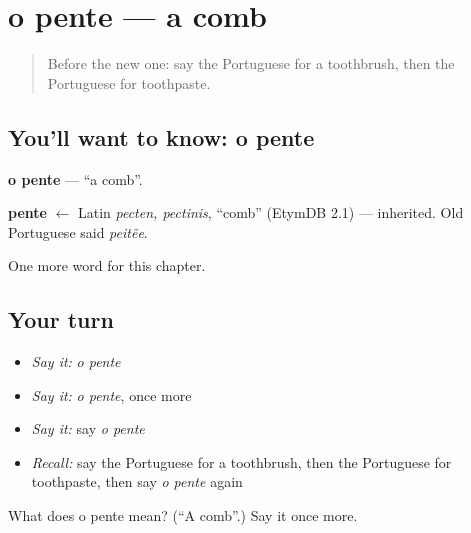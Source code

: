 \section[o pente]{o pente — a comb}

\label{lesson:PT-C95-pente}



\begin{quote}
Before the new one: say the Portuguese for a toothbrush, then the Portuguese for toothpaste.
\end{quote}

\subsection*{You'll want to know: o pente}
\textbf{o pente} — \textquotedblleft{}a comb\textquotedblright{}.

\begin{cousinweb}
\textbf{pente} $\leftarrow$ Latin \emph{pecten, pectinis}, \textquotedblleft{}comb\textquotedblright{} (EtymDB 2.1) — inherited. Old Portuguese said \emph{peitẽe}.
\end{cousinweb}

\begin{grammarlens}[title={What you've built}]
One more word for this chapter.
\end{grammarlens}

\subsection*{Your turn}
\begin{itemize}
\raggedright
  \item \emph{Say it:} \emph{o pente}
  \item \emph{Say it:} \emph{o pente}, once more
  \item \emph{Say it:} say \emph{o pente}
  \item \emph{Recall:} say the Portuguese for a toothbrush, then the Portuguese for toothpaste, then say \emph{o pente} again
\end{itemize}

\begin{tcolorbox}[breakable,colback=teal!4,colframe=teal!35!black,title={Before you move on}]
What does o pente mean? (\textquotedblleft{}A comb\textquotedblright{}.) Say it once more.
\end{tcolorbox}
